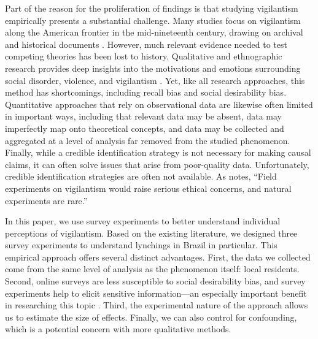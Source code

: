 \documentclass[12pt,a4paper]{article}
\begin{document}
Part of the reason for the proliferation of findings is that studying
vigilantism empirically presents a substantial challenge. Many studies focus on
vigilantism along the American frontier in the mid-nineteenth century, drawing
on archival and historical documents  \citep{brown1975strain,
courtwright2009violent, obert2018six}. However, much relevant evidence needed
to test competing theories has been lost to history. Qualitative and
ethnographic research provides deep insights into the motivations and emotions
surrounding social disorder, violence, and vigilantism
\citep{godoy2002lynchings}. Yet, like all research approaches, this method has
shortcomings, including recall bias and social desirability bias. Quantitative
approaches that rely on observational data are likewise often limited in
important ways, including that relevant data may be absent, data may
imperfectly map onto theoretical concepts, and data may be collected and
aggregated at a level of analysis far removed from the studied phenomenon.
Finally, while a credible identification strategy is not necessary for making
causal claims, it can often solve issues that arise from poor-quality data.
Unfortunately, credible identification strategies are often not available.  As
\citet[17]{bateson2020politics} notes, ``Field experiments on vigilantism would
raise serious ethical concerns, and natural experiments are rare.''

In this paper, we use survey experiments to better understand individual
perceptions of vigilantism. Based on the existing literature, we designed three
survey experiments to understand lynchings in Brazil in particular. This
empirical approach offers several distinct advantages. First, the data we
collected come from the same level of analysis as the phenomenon itself: local
residents. Second, online surveys are less susceptible to social desirability
bias, and survey experiments help to elicit sensitive information---an
especially important benefit in researching this topic \citep{grimm2010social}.
Third, the experimental nature of the approach allows us to estimate the size
of effects. Finally, we can also control for confounding, which is a potential
concern with more qualitative methods.
\end{document}
